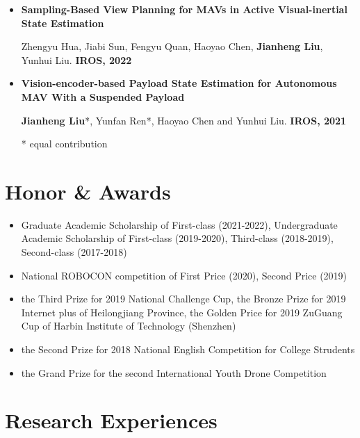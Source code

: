 \documentclass[11pt,a4paper,sans]{moderncv}        %
\begin{document}
{\begin{itemize}
\vspace{3pt}

\item{\textbf{Sampling-Based View Planning for MAVs in Active Visual-inertial State Estimation}

\small{Zhengyu Hua, Jiabi Sun, Fengyu Quan, Haoyao Chen, \textbf{Jianheng Liu}, Yunhui Liu. \textbf{IROS, 2022}}
}

\vspace{3pt}

\item{\textbf{Vision-encoder-based Payload State Estimation for Autonomous MAV With a Suspended Payload}

\small{\textbf{Jianheng Liu}*, Yunfan Ren*, Haoyao Chen and Yunhui Liu. \textbf{IROS, 2021}}
}

\footnotesize{* equal contribution}

\end{itemize}

\section{Honor \& Awards}

\vspace{6pt}

\begin{itemize}

\item{Graduate Academic Scholarship of First-class (2021-2022), Undergraduate Academic Scholarship of First-class (2019-2020), Third-class (2018-2019), Second-class (2017-2018)}

\item{National ROBOCON competition of First Price (2020), Second Price (2019)}

\item{the Third Prize for 2019 National Challenge Cup, the Bronze Prize for 2019 Internet plus of Heilongjiang Province, the Golden Price for 2019  ZuGuang Cup of Harbin Institute of Technology (Shenzhen)}

\item{the Second Prize for 2018 National English Competition for College Strudents}

\item{the Grand Prize for the second International Youth Drone Competition}

\end{itemize}


\section{Research Experiences}

}
\end{document}
